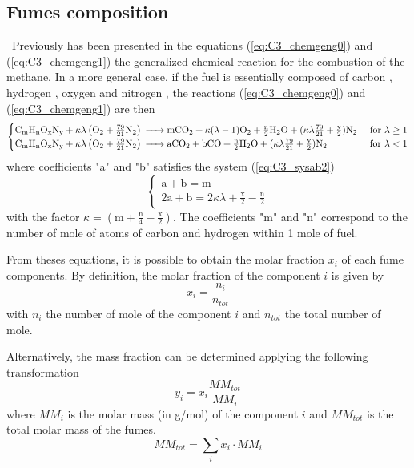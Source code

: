 \subsection{Fumes composition}
\quad\, Previously has been presented in the equations (\ref{eq:C3_chemgeng0}) and (\ref{eq:C3_chemgeng1}) the generalized chemical reaction for the combustion of the methane. 
In a more general case, if the fuel is essentially composed of carbon , hydrogen , oxygen  and nitrogen , the reactions (\ref{eq:C3_chemgeng0}) and (\ref{eq:C3_chemgeng1}) are then
\begin{equation}
\begin{cases}
\ce{C_{\text{m}}H_{\text{n}}O_{\text{x}}N_{\text{y}} +}\kappa\lambda \left(\ce{O2}+\frac{79}{21}\ce{N2}\right) \ce{-> mCO2 +} \kappa(\lambda-1)\ce{O2 + \frac{n}{2}H2O +} (\kappa\lambda\frac{79}{21} + \frac{\text{y}}{2})\ce{N2}&\text{ for $\lambda\geq 1$}\\
\ce{C_{\text{m}}H_{\text{n}}O_{\text{x}}N_{\text{y}} +}\kappa\lambda \left(\ce{O2}+\frac{79}{21}\ce{N2}\right) \ce{-> aCO2 + bCO + \frac{n}{2}H2O} + (\kappa\lambda\frac{79}{21} + \frac{\text{y}}{2})\ce{N2}&\text{ for $\lambda< 1$}
\end{cases}
\end{equation}
where coefficients "a" and "b" satisfies the system (\ref{eq:C3_sysab2})
\begin{equation}
\begin{cases}
\text{a} + \text{b} = \text{m}\\
2\text{a} + \text{b} = 2\kappa\lambda + \frac{\text{x}}{2} - \frac{\text{n}}{2}
\end{cases}\label{eq:C3_sysab2}
\end{equation}
with the factor $\kappa = (\text{m}+\frac{\text{n}}{4}-\frac{\text{x}}{2})$. The coefficients "m" and "n" correspond to the number of mole of atoms of carbon and hydrogen within 1 mole of fuel.

From theses equations, it is possible to obtain the molar fraction $x_i$ of each fume components. By definition, the molar fraction of the component $i$ is given by
\begin{equation}
x_i = \frac{n_i}{n_{tot}}
\end{equation}
with $n_i$ the number of mole of the component $i$ and $n_{tot}$ the total number of mole.

Alternatively, the mass fraction can be determined applying the following transformation
\begin{equation}
y_i = x_i\frac{MM_{tot}}{MM_i}
\end{equation}
where $MM_i$ is the molar mass (in g/mol) of the component $i$ and $MM_{tot}$ is the total molar mass of the fumes.
\begin{equation}
MM_{tot} = \sum_i x_i\cdot MM_i
\end{equation}

